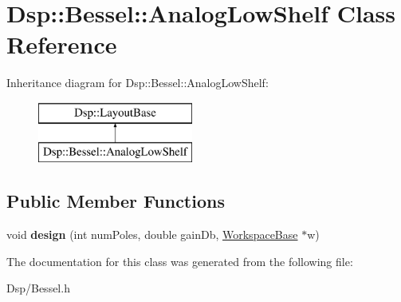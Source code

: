 \hypertarget{classDsp_1_1Bessel_1_1AnalogLowShelf}{\section{Dsp\-:\-:Bessel\-:\-:Analog\-Low\-Shelf Class Reference}
\label{classDsp_1_1Bessel_1_1AnalogLowShelf}
}
Inheritance diagram for Dsp\-:\-:Bessel\-:\-:Analog\-Low\-Shelf\-:\begin{figure}[H]
\begin{center}
\leavevmode
\includegraphics[height=2.000000cm]{classDsp_1_1Bessel_1_1AnalogLowShelf}
\end{center}
\end{figure}
\subsection*{Public Member Functions}
\begin{DoxyCompactItemize}
\item 
\hypertarget{classDsp_1_1Bessel_1_1AnalogLowShelf_a388d8493a1a42acc8de2bacfc675a797}{void {\bfseries design} (int num\-Poles, double gain\-Db, \hyperlink{structDsp_1_1Bessel_1_1WorkspaceBase}{Workspace\-Base} $\ast$w)}\label{classDsp_1_1Bessel_1_1AnalogLowShelf_a388d8493a1a42acc8de2bacfc675a797}

\end{DoxyCompactItemize}


The documentation for this class was generated from the following file\-:\begin{DoxyCompactItemize}
\item 
Dsp/Bessel.\-h\end{DoxyCompactItemize}
